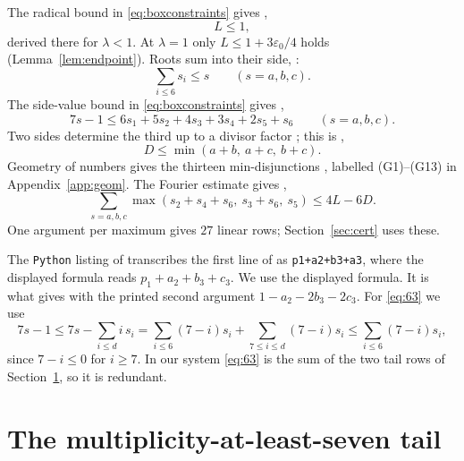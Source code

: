 \documentclass{amsart}
\numberwithin{equation}{section}
\numberwithin{table}{section}
\begin{document}
The radical bound in \eqref{eq:boxconstraints} gives \cite[(6.1)]{BBLT},
\begin{equation}\label{eq:L}
 L\le1,
\end{equation}
derived there for $\lambda<1$. At $\lambda=1$ only $L\le1+3\varepsilon_0/4$
holds (Lemma~\ref{lem:endpoint}). Roots sum into their side,
\cite[(6.2)]{BBLT}:
\begin{equation}\label{eq:root}
 \sum_{i\le6}s_i\le s\qquad(s=a,b,c).
\end{equation}
The side-value bound in \eqref{eq:boxconstraints} gives \cite[(6.3)]{BBLT},
\begin{equation}\label{eq:63}
 7s-1\le6s_1+5s_2+4s_3+3s_4+2s_5+s_6\qquad(s=a,b,c).
\end{equation}
Two sides determine the third up to a divisor factor
\cite[Proposition~2.3]{BBLT}; this is \cite[(6.4)]{BBLT},
\begin{equation}\label{eq:pair}
 D\le\min(a+b,\ a+c,\ b+c).
\end{equation}
Geometry of numbers \cite[Proposition~4.1]{BBLT} gives the thirteen
min-disjunctions \cite[(6.5)--(6.9)]{BBLT}, labelled (G1)--(G13) in
Appendix~\ref{app:geom}. The Fourier estimate \cite[Proposition~3.1]{BBLT}
gives \cite[(6.10)]{BBLT},
\begin{equation}\label{eq:fourier}
 \sum_{s=a,b,c}\max(s_2+s_4+s_6,\ s_3+s_6,\ s_5)\le4L-6D .
\end{equation}
One argument per maximum gives $27$ linear rows; Section~\ref{sec:cert}
uses these.

The \texttt{Python} listing of \cite[Appendix~A]{BBLT} transcribes the first
line of \cite[(6.9)]{BBLT} as \texttt{p1+a2+b3+a3}, where the displayed formula
reads $p_1+a_2+b_3+c_3$. We use the displayed formula. It is what
\cite[Proposition~4.1]{BBLT} gives with the printed second argument
$1-a_2-2b_3-2c_3$. For \eqref{eq:63} we use
\begin{equation}\label{eq:63proof}
 7s-1\le7s-\sum_{i\le d}i\,s_i
 =\sum_{i\le6}(7-i)s_i+\sum_{7\le i\le d}(7-i)s_i
 \le\sum_{i\le6}(7-i)s_i,
\end{equation}
since $7-i\le0$ for $i\ge7$. In our system \eqref{eq:63} is the sum of the two
tail rows of Section~\ref{sec:tail}, so it is redundant.

\section{The multiplicity-at-least-seven tail}\label{sec:tail}
\end{document}
